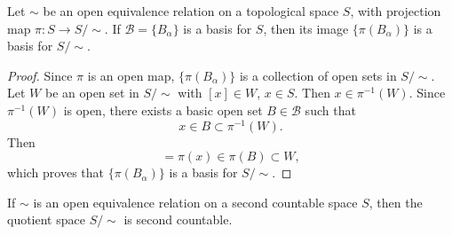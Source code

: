 \begin{theorem}
	Let $\sim$ be an open equivalence relation on a topological space $S$,
	with projection map $\pi : S\to S/\sim$. If $\mathcal{B} = \{B_\alpha\}$
	is a basis for $S$, then its image $\{\pi(B_\alpha)\}$ is a basis for
	$S/\sim$.
\end{theorem}

\begin{proof}
	Since $\pi$ is an open map, $\{\pi(B_\alpha)\}$ is a collection of open
	sets in $S/\sim$. Let $W$ be an open set in $S/\sim$ with $[x]\in W$,
	$x\in S$. Then $x\in\pi^{-1}(W)$. Since $\pi^{-1}(W)$ is open, there
	exists a basic open set $B\in\mathcal{B}$ such that
	\begin{displaymath}
		x\in B\subset \pi^{-1}(W).
	\end{displaymath}
	Then
	\begin{displaymath}
		[x]=\pi(x)\in\pi(B)\subset W,
	\end{displaymath}
	which proves that $\{\pi(B_\alpha)\}$ is a basis for $S/\sim$.
\end{proof}

\begin{corollary}\label{cor:quotient-second-countable}
	If $\sim$ is an open equivalence relation on a second countable space
	$S$, then the quotient space $S/\sim$ is second countable.
\end{corollary}
